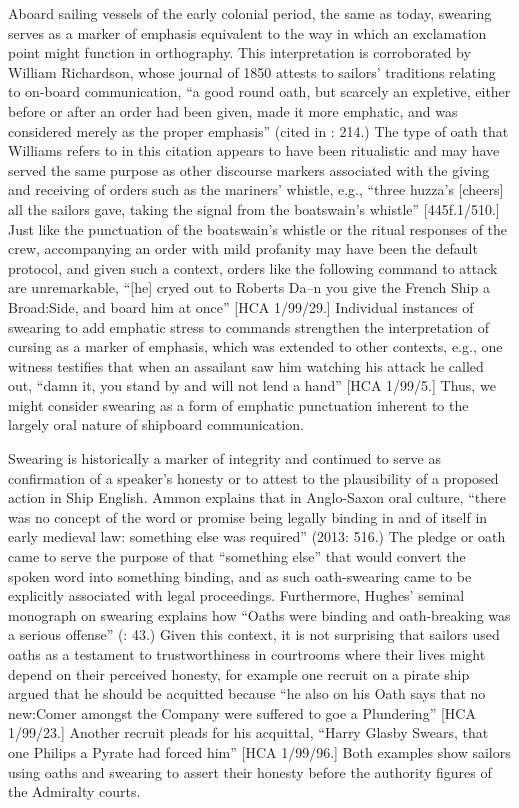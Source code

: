  Aboard sailing vessels of the early colonial period, the same as today, swearing serves as a marker of emphasis equivalent to the way in which an exclamation point might function in orthography. This interpretation is corroborated by William Richardson, whose journal of 1850 attests to sailors’ traditions relating to on-board communication, “a good round oath, but scarcely an expletive, either before or after an order had been given, made it more emphatic, and was considered merely as the proper emphasis” (cited in \citealt{AdkinsAdkins2008}: 214.) The type of oath that Williams refers to in this citation appears to have been ritualistic and may have served the same purpose as other discourse markers associated with the giving and receiving of orders such as the mariners’ whistle, e.g., “three huzza’s [cheers] all the sailors gave, taking the signal from the boatswain’s whistle” [445f.1/510.] Just like the punctuation of the boatswain’s whistle or the ritual responses of the crew, accompanying an order with mild profanity may have been the default protocol, and given such a context, orders like the following command to attack are unremarkable, “[he] cryed out to Roberts Da--n you give the French Ship a Broad:Side, and board him at once” [HCA 1/99/29.] Individual instances of swearing to add emphatic stress to commands strengthen the interpretation of cursing as a marker of emphasis, which was extended to other contexts, e.g., one witness testifies that when an assailant saw him watching his attack he called out, “damn it, you stand by and will not lend a hand” [HCA 1/99/5.] Thus, we might consider swearing as a form of emphatic punctuation inherent to the largely oral nature of shipboard communication. 

  Swearing is historically a marker of integrity and continued to serve as confirmation of a speaker’s honesty or to attest to the plausibility of a proposed action in Ship English. Ammon explains that in Anglo-Saxon oral culture, “there was no concept of the word or promise being legally binding in and of itself in early medieval law: something else was required” (2013: 516.) The pledge or oath came to serve the purpose of that “something else” that would convert the spoken word into something binding, and as such oath-swearing came to be explicitly associated with legal proceedings. Furthermore, Hughes’ seminal monograph on swearing explains how “Oaths were binding and oath-breaking was a serious offense” (\citealt{Hughes1991}: 43.) Given this context, it is not surprising that sailors used oaths as a testament to trustworthiness in courtrooms where their lives might depend on their perceived honesty, for example one recruit on a pirate ship argued that he should be acquitted because “he also on his Oath says that no new:Comer amongst the Company were suffered to goe a Plundering” [HCA 1/99/23.] Another recruit pleads for his acquittal, “Harry Glasby Swears, that one Philips a Pyrate had forced him” [HCA 1/99/96.] Both examples show sailors using oaths and swearing to assert their honesty before the authority figures of the Admiralty courts. 

